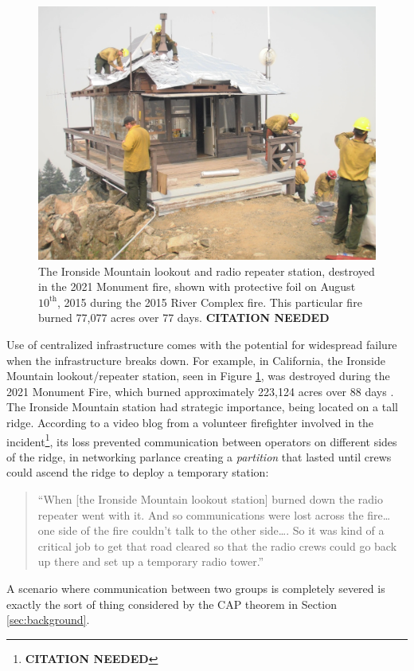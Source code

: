 \documentclass[]             %
{NASA}                       %
\theoremstyle{definition}
\newcommand{\citationneeded}{\footnote{\textbf{CITATION NEEDED}}}
\begin{document}
\begin{figure}[t]
  \centering
  \includegraphics[scale=0.085]{images/ironside.jpg}
  \caption{The Ironside Mountain lookout and radio repeater station, destroyed in the 2021
    Monument fire, shown with protective foil on August
    $10^\textrm{th}$, 2015 during the 2015 River Complex fire. This
    particular fire burned 77,077 acres over 77 days. \textbf{CITATION NEEDED}}
  \label{fig:ironside}
\end{figure}

Use of centralized infrastructure comes with the potential for
widespread failure when the infrastructure breaks down. For example,
in California, the Ironside Mountain lookout/repeater station, seen in
Figure \ref{fig:ironside}, was destroyed during the 2021 Monument
Fire, which burned approximately 223,124 acres over 88 days
\cite{2021:monumentfire}. The Ironside Mountain station had strategic
importance, being located on a tall ridge. According to a video blog
from a volunteer firefighter involved in the incident\citationneeded,
its loss prevented communication between operators on different sides
of the ridge, in networking parlance creating a \emph{partition} that
lasted until crews could ascend the ridge to deploy a temporary
station:
\begin{quote}
  ``When {[}the Ironside Mountain lookout station{]} burned down the radio
  repeater went with it. And so communications were lost across the
  fire\ldots{} one side of the fire couldn't talk to the other side\ldots.
  So it was kind of a critical job to get that road cleared so that the
  radio crews could go back up there and set up a temporary radio tower.''
\end{quote}
A scenario where communication between two groups is completely
severed is exactly the sort of thing considered by the CAP theorem in
Section \ref{sec:background}.
\end{document}

